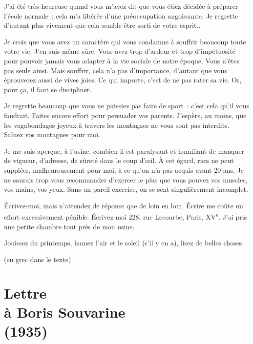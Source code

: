 \documentclass[french,twoside]{book} %
\newcommand{\signed}[1]{\bigbreak\filbreak{\raggedleft #1\par}\medskip}
\begin{document}
J'ai été très heureuse quand vous m'avez dit que vous étiez décidée à préparer l'école normale ; cela m'a libérée d'une préoccupation angoissante. Je regrette d'autant plus vivement que cela semble être sorti de votre esprit..\par
Je crois que vous avez un caractère qui vous condamne à souffrir beaucoup toute votre vie. J'en suis même sûre. Vous avez trop d'ardeur et trop d'impétuosité pour pouvoir jamais vous adapter à la vie sociale de notre époque. Vous n'êtes pas seule ainsi. Mais souffrir, cela n'a pas d'importance, d'autant que vous éprouverez aussi de vives joies. Ce qui importe, c'est de ne pas rater sa vie. Or, pour ça, il faut se discipliner.\par
Je regrette beaucoup que vous ne puissiez pas faire de sport : c'est cela qu'il vous faudrait. Faites encore effort pour persuader vos parents. J'espère, au moins, que les vagabondages joyeux à travers les montagnes ne vous sont pas interdits. Saluez vos montagnes pour moi.\par
Je me suis aperçue, à l'usine, combien il est paralysant et humiliant de manquer de vigueur, d'adresse, de sûreté dans le coup d'œil. À cet égard, rien ne peut suppléer, malheureusement pour moi, à ce qu'on n'a pas acquis avant 20 ans. Je ne saurais trop vous recommander d'exercer le plus que vous pouvez vos muscles, vos mains, vos yeux. Sans un pareil exercice, on se sent singulièrement incomplet.\par
Écrivez-moi, mais n'attendez de réponse que de loin en loin. Écrire me coûte un effort excessivement pénible. Écrivez-moi 228, rue Lecourbe, Paris, XV\textsuperscript{e}. J'ai pris une petite chambre tout près de mon usine.\par
Jouissez du printemps, humez l'air et le soleil (s'il y en a), lisez de belles choses.\par
[i] (en grec dans le texte)\par


\signed{S. WEIL.}
\section[Lettre, à Boris Souvarine, (1935)]{Lettre \\
à Boris Souvarine \\
(1935)}\renewcommand{\leftmark}{Lettre \\
à Boris Souvarine \\
(1935)}
\end{document}
